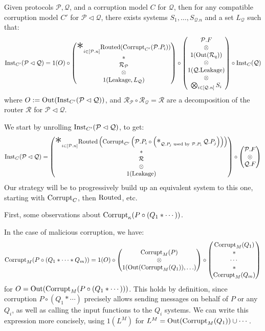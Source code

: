 \begin{theorem}
  Given protocols $\mathcal{P}, \mathcal{Q}$, and a corruption
  model $C$ for $\mathcal{Q}$, then for any compatible corruption
  model $C'$ for $\mathcal{P} \lhd \mathcal{Q}$, there exists
  systems $S_1, \ldots, S_{\mathcal{Q}.n}$ and a set $L_{\mathcal{Q}}$ such that:
  $$
  \tx{Inst}_{C'}(\mathcal{P} \lhd \mathcal{Q}) =
  1(O)\circ
  \begin{pmatrix}
    {\displaystyle \bigast}_{i \in [\mathcal{P}.n]} \tx{Routed}(\tx{Corrupt}_{C'}(\mathcal{P}.P_i))
    \cr
    *\cr
    \mathcal{R}_{\mathcal{P}}\cr
    \otimes\cr
    1(\tx{Leakage}, L_{\mathcal{Q}})
  \end{pmatrix}
  \circ
  \begin{pmatrix}
    \mathcal{P}.F\cr
    \otimes\cr
    1(\tx{Out}(\mathcal{R}_q))\cr
    \otimes\cr
    1(\mathcal{Q}.\tx{Leakage})\cr
    \otimes\cr
    \bigotimes_{i \in [\mathcal{Q}.n]} S_i\cr
  \end{pmatrix}
  \circ
  \tx{Inst}_C(\mathcal{Q})
  $$
  where $O := \text{Out}(\text{Inst}_{C'}(\mathcal{P} \lhd \mathcal{Q}))$,
  and $\mathcal{R}_{\mathcal{P}} \circ \mathcal{R}_{\mathcal{Q}} = \mathcal{R}$
  are a decomposition of the router $\mathcal{R}$ for $\mathcal{P} \lhd \mathcal{Q}$.

 We start by unrolling $\text{Inst}_{C'}(\mathcal{P} \lhd \mathcal{Q})$,
to get:
\[
\tx{Inst}_C(\mathcal{P} \lhd \mathcal{Q}) =
  \begin{pmatrix}
    {\displaystyle \bigast}_{i \in [\mathcal{P}.n]} \tx{Routed}\left(\tx{Corrupt}_{C'}\left(\mathcal{P}.P_i \circ 
        \left( \bigast_{\mathcal{Q}.P_j \tx{ used by } \mathcal{P}.P_i} \mathcal{Q}.P_j \right)
    \right)\right)\cr
    *\cr
    \mathcal{R}\cr
    \otimes\cr
    1(\tx{Leakage})
  \end{pmatrix}
  \circ \begin{pmatrix}
    \mathcal{P}.F\cr
    \otimes \cr
    \mathcal{Q}.F
  \end{pmatrix}
\]
Our strategy will be to progressively build up an equivalent system
to this one, starting with $\text{Corrupt}_C$, then $\text{Routed}$, etc.

First, some observations about $\text{Corrupt}_\kappa(P \circ (Q_1 * \cdots))$.

In the case of malicious corruption, we have:
$$
\text{Corrupt}_M(P \circ (Q_1 * \cdots * Q_m)) =
1(O) \circ
\begin{pmatrix}
  \text{Corrupt}_M(P)\cr
  \otimes\cr
  1(\text{Out}(\text{Corrupt}_M(Q_1)), \ldots)\cr
\end{pmatrix}
\circ
\begin{pmatrix}
  \text{Corrupt}_M(Q_1)\cr
  *\cr
  \cdots\cr
  *\cr
  \text{Corrupt}_M(Q_m)\cr
\end{pmatrix}
$$
for $O = \text{Out}(\text{Corrupt}_M(P \circ (Q_1 * \cdots)))$.
This holds by definition, since corruption $P \circ (Q_1 * \cdots)$ precisely allows
sending messages on behalf of $P$ or any $Q_i$, as well as calling
the input functions to the $Q_i$ systems.
We can write this expression more concisely,
using $1(L^M)$ for $L^M = \text{Out}(\text{Corrupt}_M(Q_1)) \cup \cdots$.


\end{theorem}
